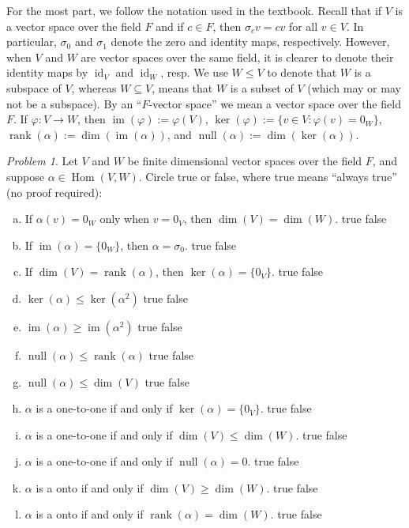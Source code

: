 \documentclass[11pt]{paper}
\theoremstyle{remark}
\newtheorem{problem}{Problem}
\newcommand{\<}{\ensuremath{\langle}}
\renewcommand{\>}{\ensuremath{\rangle}}
\newcommand\Hom{\ensuremath{\operatorname{Hom}}}
\newcommand{\id}{\ensuremath{\operatorname{id}}}
\newcommand{\nulity}[1]{\ensuremath{\operatorname{null}(#1)}}
\renewcommand{\ker}[1]{\ensuremath{\operatorname{ker}(#1)}}
\renewcommand{\dim}[1]{\ensuremath{\operatorname{dim}(#1)}}
\newcommand\im[1]{\ensuremath{\operatorname{im}(#1)}}
\newcommand{\rank}[1]{\ensuremath{\operatorname{rank}(#1)}}
\renewcommand{\phi}{\ensuremath{\varphi}}
\renewcommand{\leq}{\ensuremath{\leqslant}}
\renewcommand{\geq}{\ensuremath{\geqslant}}
\begin{document}
\medskip

For the most part, we follow the notation used in the textbook.
Recall that if $V$ is a vector space over the field $F$ and if
$c\in F$, then $\sigma_c v = cv$ for all $v \in V$.
In particular, $\sigma_0$ and $\sigma_1$ denote the zero and identity maps,
respectively. However, when $V$ and $W$ are vector spaces over the same field,
it is clearer to denote their identity maps by $\id_V$ and $\id_W$, resp.
We use $W\leq V$ to denote that $W$ is a subspace of $V$, 
whereas $W\subseteq V$, means that $W$ is a subset of $V$ 
(which may or may not be a subspace).  By an ``$F$-vector space'' we mean a
vector space over the field $F$. If $\phi : V \rightarrow W$, then
$\im{\phi} := \phi(V)$, $\ker{\phi} := \{v \in V : \phi(v) = 0_W\}$,
$\rank{\alpha} := \dim{\im{\alpha}}$, and $\nulity{\alpha} := \dim{\ker{\alpha}}$.
\probskip

\begin{problem}
Let $V$ and $W$ be finite dimensional vector spaces over the field $F$, and
suppose $\alpha \in \Hom(V,W)$.
Circle true or false, where true means ``always true'' (no proof required):
\begin{enumerate}[(a)]
\item If $\alpha(v) = 0_W$ only when $v=0_V$, then $\dim{V} = \dim{W}$.
 \hfill true \hskip1cm false
\item If $\im{\alpha} = \{0_W\}$, then $\alpha = \sigma_0$.
 \hfill true \hskip1cm false
\item If $\dim{V} = \rank{\alpha}$, then $\ker{\alpha} = \{0_V\}$.
 \hfill true \hskip1cm false
\item $\ker{\alpha}\leq \ker{\alpha^2}$
 \hfill true \hskip1cm false
\item $\im{\alpha}\geq \im{\alpha^2}$
 \hfill true \hskip1cm false
\item $\nulity{\alpha} \leq \rank{\alpha}$
 \hfill true \hskip1cm false
\item $\nulity{\alpha} \leq \dim{V}$
 \hfill true \hskip1cm false
\item $\alpha$ is a one-to-one if and only if $\ker{\alpha} = \{0_V\}$.
 \hfill true \hskip1cm false
\item $\alpha$ is a one-to-one if and only if $\dim{V} \leq \dim{W}$.
 \hfill true \hskip1cm false
\item $\alpha$ is a one-to-one if and only if $\nulity{\alpha} = 0$.
 \hfill true \hskip1cm false
\item $\alpha$ is a onto if and only if $\dim{V} \geq \dim{W}$.
 \hfill true \hskip1cm false
\item $\alpha$ is a onto if and only if $\rank{\alpha} =\dim{W}$.
 \hfill true \hskip1cm false
\end{enumerate}
\end{problem}
\end{document}
